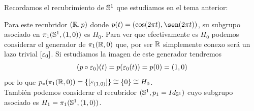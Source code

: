 \begin{ejemplo}
\begin{enumerate}
        Recordamos el recubrimiento de $\mathbb{S}^1$ que estudiamos en el tema anterior:

        \begin{figure}[H]
            \centering
        \end{figure}%
        Para este recubridor $(\mathbb{R}, p)$ donde $p(t) = (\cos(2\pi t), \sen(2\pi t))$, su subgrupo asociado en $\pi_1(\mathbb{S}^1, (1,0))$ es $H_0$. Para ver que efectivamente es $H_0$ podemos considerar el generador de $\pi_1(\mathbb{R}, 0)$ que, por ser $\mathbb{R}$ simplemente conexo será un lazo trivial $[\varepsilon_0]$. Si estudiamos la imagen de este generador tendremos 
        \begin{gather*}
            (p\circ \varepsilon_0)(t) = p(\varepsilon_0(t)) = p(0) = (1,0)
        \end{gather*}
        por lo que $p_*(\pi_1(\mathbb{R},0)) = \{[\varepsilon_{(1,0)}]\} \cong \{0\}\cong H_0$.\\

        También podemos considerar el recubridor $(\mathbb{S}^1, p_1=Id_{\mathbb{S}^1})$ cuyo subgrupo asociado es $H_1 = \pi_1(\mathbb{S}^1, (1,0))$.\\


\end{enumerate}
\end{ejemplo}
